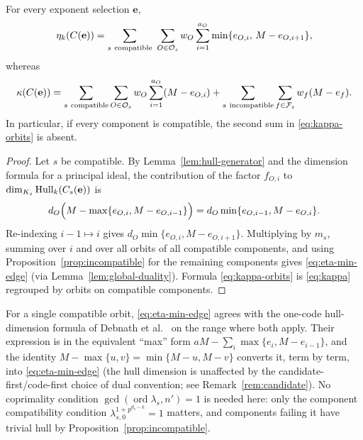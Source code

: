 \begin{proposition}\label{prop:min-edge}
For every exponent selection $\mathbf{e}$,
\begin{equation}\label{eq:eta-min-edge}
\eta_k(C(\mathbf{e}))
 =\sum_{s\ \mathrm{compatible}}\ \sum_{O\in\mathcal O_s}
   w_O\sum_{i=1}^{a_O}\min\{e_{O,i},\,M-e_{O,i+1}\},
\end{equation}
whereas
\begin{equation}\label{eq:kappa-orbits}
\kappa(C(\mathbf{e}))
 =\sum_{s\ \mathrm{compatible}}\sum_{O\in\mathcal O_s}
   w_O\sum_{i=1}^{a_O}(M-e_{O,i})
  +\sum_{s\ \mathrm{incompatible}}\sum_{f\in\mathcal F_s}w_f(M-e_f).
\end{equation}
In particular, if every component is compatible, the second sum in
\eqref{eq:kappa-orbits} is absent.
\end{proposition}

\begin{proof}
Let $s$ be compatible.  By Lemma~\ref{lem:hull-generator} and the dimension
formula for a principal ideal, the contribution of the factor $f_{O,i}$ to
$\dim_{K_s}\operatorname{Hull}_k(C_s(\mathbf{e}))$ is
\[
d_O\Bigl(M-\max\{e_{O,i},M-e_{O,i-1}\}\Bigr)
   =d_O\min\{e_{O,i-1},M-e_{O,i}\}.
\]
Re-indexing $i-1\mapsto i$ gives $d_O\min\{e_{O,i},M-e_{O,i+1}\}$.
Multiplying by $m_s$, summing over $i$ and over all orbits of all compatible
components, and using Proposition~\ref{prop:incompatible} for the remaining
components gives \eqref{eq:eta-min-edge} (via
Lemma~\ref{lem:global-duality}).  Formula \eqref{eq:kappa-orbits} is
\eqref{eq:kappa} regrouped by orbits on compatible components.
\end{proof}

\begin{remark}\label{rem:debnath-agreement}
For a single compatible orbit, \eqref{eq:eta-min-edge} agrees with the
one-code hull-dimension formula of Debnath et al.\
\cite{debnathAffine2026} on the range where both apply. Their expression is
in the equivalent ``max'' form
$aM-\sum_i\max\{e_i,M-e_{i-1}\}$, and the identity
$M-\max\{u,v\}=\min\{M-u,M-v\}$ converts it, term by term, into
\eqref{eq:eta-min-edge} (the hull dimension is unaffected by the
candidate-first/code-first choice of dual convention; see
Remark~\ref{rem:candidate}). No coprimality condition
$\gcd(\operatorname{ord}\lambda_s,n')=1$ is needed here: only the component
compatibility condition $\lambda_{s,0}^{1+p^{d_s-k}}=1$ matters, and
components failing it have trivial hull by
Proposition~\ref{prop:incompatible}.
\end{remark}

